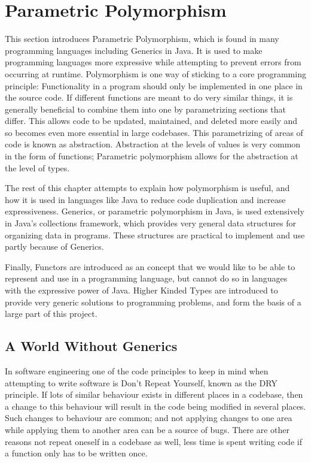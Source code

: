 \chapter{Parametric Polymorphism}\label{sec:poly}
This section introduces Parametric Polymorphism, which is found in many
programming languages including Generics in Java. It is used to make
programming languages more expressive while attempting to prevent errors from
occurring at runtime.  Polymorphism is one way of sticking to a core
programming principle: Functionality in a program should only be implemented in
one place in the source code. If different functions are meant to do very
similar things, it is generally beneficial to combine them into one by
parametrizing sections that differ. This allows code to be updated, maintained,
and deleted more easily and so becomes even more essential in large codebases.
This parametrizing of areas of code is known as abstraction. Abstraction at the
levels of values is very common in the form of functions; Parametric
polymorphism allows for the abstraction at the level of types.

The rest of this chapter attempts to explain how polymorphism is useful, and how
it is used in languages like Java to reduce code duplication and increase
expressiveness. Generics, or parametric polymorphism in Java, is used extensively
in Java's collections framework, which provides very general data structures
for organizing data in programs. These structures are practical to implement
and use partly because of Generics.

Finally, Functors are introduced as an concept that we would like to be able to
represent and use in a programming language, but cannot do so in languages with
the expressive power of Java. Higher Kinded Types are introduced to provide
very generic solutions to programming problems, and form the basis of a large
part of this project.

\section{A World Without Generics}
In software engineering one of the code principles to keep in mind when
attempting to write software is Don't Repeat Yourself, known as the DRY
principle. If lots of similar behaviour exists in different places in a
codebase, then a change to this behaviour will result in the code being
modified in several places.  Such changes to behaviour are common; and not
applying changes to one area while applying them to another area can be a
source of bugs. There are other reasons not repeat oneself in a codebase as
well, less time is spent writing code if a function only has to be
written once.

